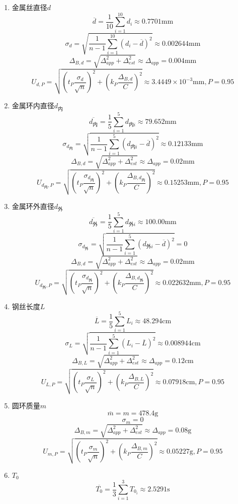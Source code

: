 \documentclass[UTF8]{ctexart}
\begin{document}
\begin{enumerate}
    \item 金属丝直径$d$
    \[\overline{d}=\frac{1}{10}\sum_{i = 1}^{10} d_i\approx 0.7701\mathrm{mm}\]
    \[\sigma _d=\sqrt{\frac{1}{n-1}\sum_{i=1}^{10}\left(d_i-\overline{d}\right)^2}\approx 0.002644\mathrm{mm}\] 
    \[\Delta_{B,d}=\sqrt{\Delta_{app}^2+\Delta_{est}^2}\approx \Delta_{app}=0.004\mathrm{mm}\]
    \[U_{d,P}=\sqrt{\left(t_P\frac{\sigma_d}{\sqrt{n}}\right)^2+\left(k_P\frac{\Delta_{B,d}}{C}\right)^2}\approx 3.4449\times 10^{-3}\mathrm{mm}, P=0.95\]
    \item 金属环内直径$d_\text{内}$
    \[\overline{d_\text{内}}=\frac{1}{5}\sum_{i = 1}^{5} d_{\text{内}i}\approx 79.652\mathrm{mm}\]
    \[\sigma _{d_\text{内}}=\sqrt{\frac{1}{n-1}\sum_{i=1}^{5}\left(d_{\text{内}i}-\overline{d}\right)^2}\approx 0.12133\mathrm{mm}\] 
    \[\Delta_{B,d}=\sqrt{\Delta_{app}^2+\Delta_{est}^2}\approx \Delta_{app}=0.02\mathrm{mm}\]
    \[U_{d_\text{内},P}=\sqrt{\left(t_P\frac{\sigma_{d_\text{内}}}{\sqrt{n}}\right)^2+\left(k_P\frac{\Delta_{B,d_\text{内}}}{C}\right)^2}\approx 0.15253\mathrm{mm}, P=0.95\]
    \item 金属环外直径$d_\text{外}$
    \[\overline{d_\text{外}}=\frac{1}{5}\sum_{i = 1}^{5} d_{\text{外}i}\approx 100.00\mathrm{mm}\]
    \[\sigma _{d_\text{外}}=\sqrt{\frac{1}{n-1}\sum_{i=1}^{5}\left(d_{\text{外}i}-\overline{d}\right)^2}=0\] 
    \[\Delta_{B,d}=\sqrt{\Delta_{app}^2+\Delta_{est}^2}\approx \Delta_{app}=0.02\mathrm{mm}\]
    \[U_{d_\text{外},P}=\sqrt{\left(t_P\frac{\sigma_{d_\text{外}}}{\sqrt{n}}\right)^2+\left(k_P\frac{\Delta_{B,d_\text{外}}}{C}\right)^2}\approx 0.022632\mathrm{mm}, P=0.95\]
    \item 钢丝长度$L$
    \[\overline{L}=\frac{1}{5}\sum_{i = 1}^{5} L_i\approx 48.294\mathrm{cm}\]
    \[\sigma _L=\sqrt{\frac{1}{n-1}\sum_{i=1}^{5}\left(L_i-\overline{L}\right)^2}\approx 0.008944\mathrm{cm}\] 
    \[\Delta_{B,L}=\sqrt{\Delta_{app}^2+\Delta_{est}^2}\approx \Delta_{app}=0.12\mathrm{cm}\]
    \[U_{L,P}=\sqrt{\left(t_P\frac{\sigma_L}{\sqrt{n}}\right)^2+\left(k_P\frac{\Delta_{B,L}}{C}\right)^2}\approx 0.07918\mathrm{cm}, P=0.95\]
    \item 圆环质量$m$
    \[\overline{m}=m=478.4\mathrm{g}\]
    \[\sigma _m=0\] 
    \[\Delta_{B,m}=\sqrt{\Delta_{app}^2+\Delta_{est}^2}\approx \Delta_{app}=0.08\mathrm{g}\]
    \[U_{m,P}=\sqrt{\left(t_P\frac{\sigma_m}{\sqrt{n}}\right)^2+\left(k_P\frac{\Delta_{B,m}}{C}\right)^2}\approx 0.05227\mathrm{g}, P=0.95\]
    \item $T_0$
    \[\overline{T_0}=\frac{1}{3}\sum_{i = 1}^{3} T_{0_i}\approx 2.5291\mathrm{s}\]

\end{enumerate}
\end{document}
